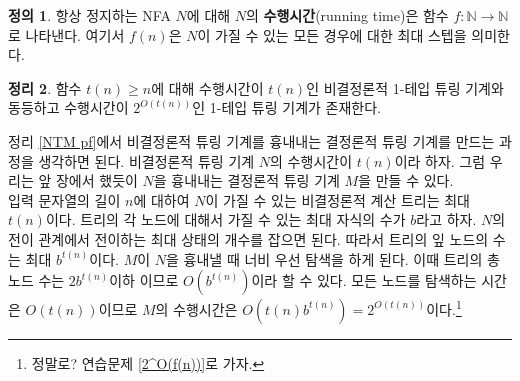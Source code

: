 \documentclass[b5paper, 11pt]{book}
\theoremstyle{definition}
\newtheorem{defn}{정의}[chapter]
\newtheorem{thm}[defn]{정리}
\newenvironment{pf*}{\pushQED{\qed}\pf}
{\popQED\endpf}
\begin{document}
\begin{defn}
    항상 정지하는 NFA $N$에 대해 $N$의 \textbf{수행시간}(running time)은 함수 $f: \mathbb{N}\rightarrow \mathbb{N}$로 나타낸다. 여기서 $f(n)$은 $N$이 가질 수 있는 모든 경우에 대한 최대 스텝을 의미한다. 
\end{defn}
\begin{thm}
    함수 $t(n) \ge n$에 대해 수행시간이 $t(n)$인 비결정론적 1-테입 튜링 기계와 동등하고 수행시간이 $2^{O(t(n))}$인 1-테입 튜링 기계가 존재한다. 
\end{thm}
\begin{pf*}
    정리 \ref{NTM pf}에서 비결정론적 튜링 기계를 흉내내는 결정론적 튜링 기계를 만드는 과정을 생각하면 된다. 비결정론적 튜링 기계 $N$의 수행시간이 $t(n)$이라 하자. 그럼 우리는 앞 장에서 했듯이 $N$을 흉내내는 결정론적 튜링 기계 $M$을 만들 수 있다. \\ 
    입력 문자열의 길이 $n$에 대하여 $N$이 가질 수 있는 비결정론적 계산 트리는 최대 $t(n)$이다. 트리의 각 노드에 대해서 가질 수 있는 최대 자식의 수가 $b$라고 하자. $N$의 전이 관계에서 전이하는 최대 상태의 개수를 잡으면 된다. 따라서 트리의 잎 노드의 수는 최대 $b^{t(n)}$이다. $M$이 $N$을 흉내낼 때 너비 우선 탐색을 하게 된다. 이때 트리의 총 노드 수는 $2b^{t(n)}$이하 이므로 $O(b^{t(n)})$이라 할 수 있다. 모든 노드를 탐색하는 시간은 $O(t(n))$이므로 $M$의 수행시간은 $O(t(n)b^{t(n)}) = 2^{O(t(n))}$이다.\footnote{정말로? 연습문제 \ref{2^O(f(n))}로 가자.}
\end{pf*}
\end{document}
